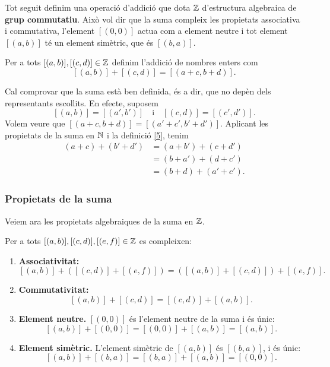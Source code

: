 Tot seguit definim una operació d'addició que dota $\mathbb{Z}$ d'estructura algebraica de \textbf{grup commutatiu}. Això vol dir que la suma compleix les propietats associativa i commutativa, l'element $[(0,0)]$ actua com a element neutre i tot element $[(a,b)]$ té un element simètric, que és $[(b,a)]$.

\begin{definicio}
Per a tots $[(a,b)],[(c,d)]\in \mathbb{Z}$ definim l'addició de nombres enters com
\begin{equation}\label{4}
[(a,b)]+[(c,d)]=[(a+c,b+d)].
\end{equation}
\end{definicio}

Cal comprovar que la suma està ben definida, és a dir, que no depèn dels representants escollits. En efecte, suposem
\begin{equation}\label{5}
[(a,b)]=[(a',b')] \quad \text{i} \quad [(c,d)]=[(c',d')].
\end{equation}
Volem veure que $[(a+c,b+d)]=[(a'+c',b'+d')]$. Aplicant les propietats de la suma en $\mathbb{N}$ i la definició \eqref{5}, tenim
\[
\begin{array}{rl}
(a+c)+(b'+d') &= (a+b')+(c+d')\\
&= (b+a')+(d+c')\\
&= (b+d)+(a'+c').
\end{array}
\]

\subsubsection{Propietats de la suma}

Veiem ara les propietats algebraiques de la suma en $\mathbb{Z}$.

\begin{proposicio}
Per a tots $[(a,b)],[(c,d)],[(e,f)]\in \mathbb{Z}$ es compleixen:

\begin{enumerate}
\item \textbf{Associativitat:}
\[
[(a,b)]+\left( [(c,d)]+[(e,f)]\right) =\left( [(a,b)]+[(c,d)]\right) +[(e,f)].
\]
\item \textbf{Commutativitat:}
\[
[(a,b)]+[(c,d)]=[(c,d)]+[(a,b)].
\]
\item \textbf{Element neutre.} $[(0,0)]$ és l'element neutre de la suma i és únic:
\[
[(a,b)]+[(0,0)]=[(0,0)]+[(a,b)]=[(a,b)].
\]
\item \textbf{Element simètric.} L'element simètric de $[(a,b)]$ és $[(b,a)]$, i és únic:
\[
[(a,b)]+[(b,a)]=[(b,a)]+[(a,b)]=[(0,0)].
\]
\end{enumerate}
\end{proposicio}

